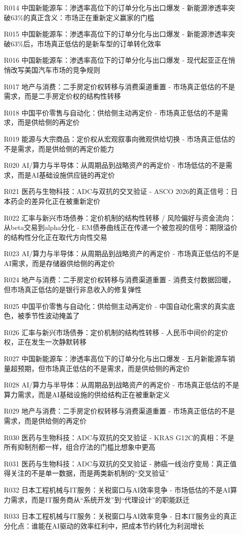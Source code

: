 \documentclass[11pt]{ctexart}
\begin{document}
\begin{itemize}
  \item [R014] 中国新能源车：渗透率高位下的订单分化与出口爆发 - 新能源渗透率突破63\%的真正含义：市场正在重新定义赢家的门槛
  \item [R015] 中国新能源车：渗透率高位下的订单分化与出口爆发 - 新能源渗透率突破63\%后，市场真正低估的是新车型的订单转化效率
  \item [R016] 中国新能源车：渗透率高位下的订单分化与出口爆发 - 现代起亚正在悄悄改写美国汽车市场的竞争规则
  \item [R017] 地产与消费：二手房定价权转移与消费渠道重置 - 市场真正低估的不是需求，而是二手房定价权的结构性转移
  \item [R018] 中国平价零售与自动化：供给侧主动再定价 - 市场真正低估的不是需求，而是供给侧的再定价
  \item [R019] 能源与大宗商品：定价权从宏观叙事向微观供给切换 - 市场真正低估的不是需求，而是供给侧的再定价能力
  \item [R020] AI/算力与半导体：从周期品到战略资产的再定价 - 市场低估的不是需求，而是AI基础设施供应链的再定价
  \item [R021] 医药与生物科技：ADC与双抗的交叉验证 - ASCO 2026的真正信号：日本药企的差异化正在被重新定价
  \item [R022] 汇率与新兴市场债券：定价机制的结构性转移 / 风险偏好与资金流向：从beta交易到alpha分化 - EM债券曲线正在传递一个被忽视的信号：期限溢价的结构性分化正在取代方向性交易
  \item [R023] AI/算力与半导体：从周期品到战略资产的再定价 - 市场真正低估的不是AI需求，而是存储器供给侧的再定价
  \item [R024] 地产与消费：二手房定价权转移与消费渠道重置 - 消费支付数据回暖，但市场真正低估的是银行非息收入的修复弹性
  \item [R025] 中国平价零售与自动化：供给侧主动再定价 - 中国自动化需求的真实底色，被季节性波动掩盖了
  \item [R026] 汇率与新兴市场债券：定价机制的结构性转移 - 人民币中间价的定价权，正在发生一次静默转移
  \item [R027] 中国新能源车：渗透率高位下的订单分化与出口爆发 - 五月新能源车销量超预期，但市场真正低估的不是需求，而是供给侧的再定价
  \item [R028] AI/算力与半导体：从周期品到战略资产的再定价 - 市场真正低估的不是算力需求，而是AI基础设施的供给结构正在被重新定义
  \item [R029] 地产与消费：二手房定价权转移与消费渠道重置 - 市场真正低估的不是需求，而是供给侧的再定价
  \item [R030] 医药与生物科技：ADC与双抗的交叉验证 - KRAS G12C的真相：不是所有抑制剂都一样，组合疗法的门槛比想象中更高
  \item [R031] 医药与生物科技：ADC与双抗的交叉验证 - 肺癌一线治疗变局：真正值得关注的不是单一数据，而是两类新机制的“交叉验证”
  \item [R032] 日本工程机械与IT服务：关税窗口与AI效率竞争 - 市场低估的不是AI算力需求，而是IT服务商从“系统开发”到“代理设计”的职能跃迁
  \item [R033] 日本工程机械与IT服务：关税窗口与AI效率竞争 - 日本IT服务业的真正分化点：谁能在AI驱动的效率红利中，把成本节约转化为利润增长
\end{itemize}
\end{document}
